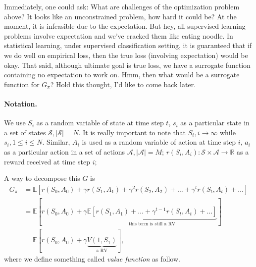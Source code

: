 \documentclass[11pt,a4paper]{article}
\def\red{\color{red}}
\newcommand{\abs}[1]{\left\lvert#1\right\rvert}
\theoremstyle{definition}
\theoremstyle{remark}
\begin{document}
Immediately, one could ask: What are challenges of the optimization problem above? It looks like an unconstrained problem, how hard it could be? At the moment, it is infeasible due to the expectation. But hey, all supervised learning problems involve expectation and we've cracked them like eating noodle.
In statistical learning, under supervised classification setting, it is guaranteed that if we do well on empirical loss, then the true loss (involving expectation) would be okay. That said, although ultimate goal is true loss, we have a surrogate function containing no expectation to work on. 
{\red Hmm, then what would be a surrogate function for $G_\pi$? } Hold this thought, I'd like to come back later.



\paragraph{Notation.} We use $S_i$ as a random variable of state at time step $t$, $s_i$ as a particular state in a set of states  $\mathcal{S}, \abs{\mathcal{S}}=N$. It is really important to note that $S_i, i \to \infty$ while $s_i, 1\leq i \leq N$.
Similar, $A_i$ is used as a random variable of action at time step $i$,  $a_i$ as a particular action in a set of actions  $\mathcal{A}, \abs{\mathcal{A}}=M$;
$r(S_i, A_i): \mathcal{S} \times \mathcal{A} \rightarrow \mathbb{R}$ as a reward received at time step $i$;

A way to decompose this $G$ is
\begin{align*}
     G_{\pi} &= \mathbb{E} \left[  r(S_0, A_0) + \gamma r(S_1, A_1) + \gamma^2 r(S_2, A_2) + \ldots + \gamma^{t}r(S_t, A_t) + \ldots \right] \\
     &= \mathbb{E} \left[r(S_0, A_0) + \gamma \underbrace{\mathbb{E} \left[ r(S_1, A_1) + \ldots  + \gamma^{t-1} r(S_t, A_t) + \ldots  \right]}_{\text{this term is still a RV}} \right]\\
     &= \mathbb{E}[r(S_0, A_0) + \gamma  \underbrace{V(1, S_1)}_{\text{a RV}} ],
\end{align*}
where we define something called \textit{value function} as follow.
\end{document}
